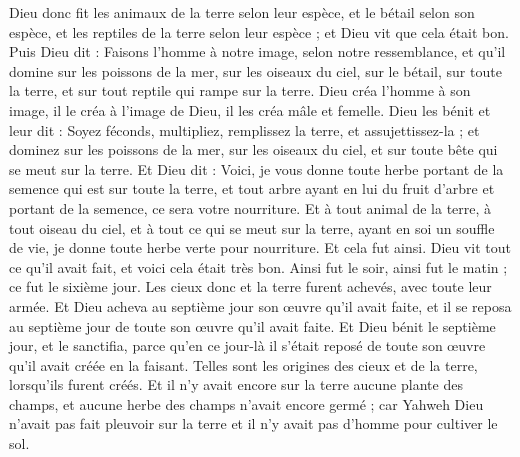 \begin{multicols}{2}
Dieu donc fit les animaux de la terre selon leur espèce, et le bétail selon son espèce, et les reptiles de la terre selon leur espèce ; et Dieu vit que cela était bon.
Puis Dieu dit : Faisons l'homme à notre image, selon notre ressemblance, et qu'il domine sur les poissons de la mer, sur les oiseaux du ciel, sur le bétail, sur toute la terre, et sur tout reptile qui rampe sur la terre.
Dieu créa l'homme à son image, il le créa à l'image de Dieu, il les créa mâle et femelle.
Dieu les bénit et leur dit : Soyez féconds, multipliez, remplissez la terre, et assujettissez-la ; et dominez sur les poissons de la mer, sur les oiseaux du ciel, et sur toute bête qui se meut sur la terre.
Et Dieu dit : Voici, je vous donne toute herbe portant de la semence qui est sur toute la terre, et tout arbre ayant en lui du fruit d'arbre et portant de la semence, ce sera votre nourriture.
Et à tout animal de la terre, à tout oiseau du ciel, et à tout ce qui se meut sur la terre, ayant en soi un souffle de vie, je donne toute herbe verte pour nourriture. Et cela fut ainsi.
Dieu vit tout ce qu'il avait fait, et voici cela était très bon. Ainsi fut le soir, ainsi fut le matin ; ce fut le sixième jour.
\VerseOne{}Les cieux donc et la terre furent achevés, avec toute leur armée.
Et Dieu acheva au septième jour son œuvre qu'il avait faite, et il se reposa au septième jour de toute son œuvre qu'il avait faite.
Et Dieu bénit le septième jour, et le sanctifia, parce qu'en ce jour-là il s'était reposé de toute son œuvre qu'il avait créée en la faisant.
Telles sont les origines des cieux et de la terre, lorsqu'ils furent créés.
Et il n'y avait encore sur la terre aucune plante des champs, et aucune herbe des champs n'avait encore germé ; car Yahweh Dieu n'avait pas fait pleuvoir sur la terre et il n'y avait pas d'homme pour cultiver le sol.

\end{multicols}
